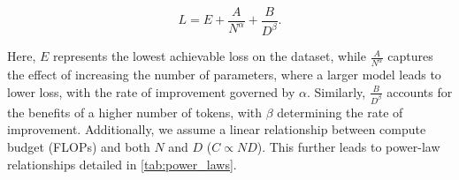 \begin{equation}
\label{eq:scaling_laws}
    L = E + \frac{A}{N^{\alpha}} + \frac{B}{D^{\beta}}.
\end{equation}



\noindent Here, \(E\) represents the lowest achievable loss on the dataset,
while \(\frac{A}{N^{\alpha}}\) captures the effect of increasing the number of
parameters, where a larger model leads to lower loss, with the rate of
improvement governed by \(\alpha\). Similarly, \(\frac{B}{D^{\beta}}\) accounts
for the benefits of a higher number of tokens, with \(\beta\) determining the
rate of improvement. Additionally, we assume a linear relationship between
compute budget (FLOPs) and both \(N\) and \(D\) (\(C \propto ND\)). This further
leads to power-law relationships detailed in \cref{tab:power_laws}.


        

\begin{table}[h]
    \centering
    \setlength{\tabcolsep}{16pt}
    \renewcommand{\arraystretch}{1}
     \caption{\textbf{Pre-training data mixture.} Unless otherwise
    specified, the training mixture contains 45\%, 45\% and 10\% of image
    captions, interleaved documents and text-only data.}
    \label{tab:pretraining_datasets}
    \vspace{-5pt}
\end{table}


